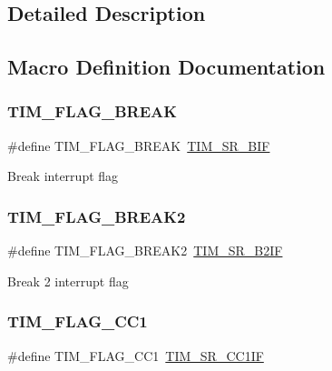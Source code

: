 \subsection{Detailed Description}


\subsection{Macro Definition Documentation}
\mbox{\label{group___t_i_m___flag__definition_ga01aedbe0676064a4d47dee474ddb863d}} 
\subsubsection{\texorpdfstring{TIM\_FLAG\_BREAK}{TIM\_FLAG\_BREAK}}
{\footnotesize\ttfamily \#define T\+I\+M\+\_\+\+F\+L\+A\+G\+\_\+\+B\+R\+E\+AK~\mbox{\hyperlink{group___peripheral___registers___bits___definition_ga6d52cd5a57c9a26b0d993c93d9875097}{T\+I\+M\+\_\+\+S\+R\+\_\+\+B\+IF}}}

Break interrupt flag \mbox{\label{group___t_i_m___flag__definition_ga70cd9741ad1ec0358c8d4388a5082e1a}} 
\subsubsection{\texorpdfstring{TIM\_FLAG\_BREAK2}{TIM\_FLAG\_BREAK2}}
{\footnotesize\ttfamily \#define T\+I\+M\+\_\+\+F\+L\+A\+G\+\_\+\+B\+R\+E\+A\+K2~\mbox{\hyperlink{group___peripheral___registers___bits___definition_gaef0c136d9338baf71a64ff650b385645}{T\+I\+M\+\_\+\+S\+R\+\_\+\+B2\+IF}}}

Break 2 interrupt flag \mbox{\label{group___t_i_m___flag__definition_gaa7eb8be054b9bd217a9abb1c8687cc55}} 
\subsubsection{\texorpdfstring{TIM\_FLAG\_CC1}{TIM\_FLAG\_CC1}}
{\footnotesize\ttfamily \#define T\+I\+M\+\_\+\+F\+L\+A\+G\+\_\+\+C\+C1~\mbox{\hyperlink{group___peripheral___registers___bits___definition_ga449a61344a97608d85384c29f003c0e9}{T\+I\+M\+\_\+\+S\+R\+\_\+\+C\+C1\+IF}}}


